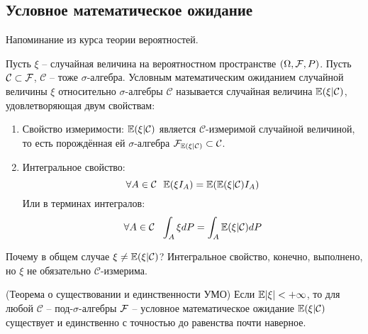 \subsection{Условное математическое ожидание}

\begin{note}
    Напоминание из курса теории вероятностей.
\end{note}

\begin{definition}
    Пусть $\xi$ -- случайная величина на вероятностном пространстве $(\Omega, \mathcal{F}, P)$. Пусть $\mathcal{C} \subset \mathcal{F}$, $\mathcal{C}$ -- тоже $\sigma$-алгебра. Условным математическим ожиданием случайной величины $\xi$ относительно $\sigma$-алгебры $\mathcal{C}$ называется случайная величина $\mathbb{E}(\xi | \mathcal{C})$, удовлетворяющая двум свойствам:
    \begin{enumerate}
        \item Свойство измеримости: $\mathbb{E}(\xi | \mathcal{C})$ является $\mathcal{C}$-измеримой случайной величиной, то есть порождённая ей $\sigma$-алгебра $\mathcal{F}_{\mathbb{E}(\xi | \mathcal{C})} \subset \mathcal{C}$.

        \item Интегральное свойство:
        \[
            \forall A \in \mathcal{C} \ \ \mathbb{E}(\xi I_A) = \mathbb{E}(\mathbb{E}(\xi | \mathcal{C}) I_A)
        \]
        Или в терминах интегралов:
        \[
            \forall A \in \mathcal{C} \ \ \int_A \xi dP = \int_A \mathbb{E}(\xi | \mathcal{C}) dP
        \]
    \end{enumerate}
\end{definition}

\begin{note}
    Почему в общем случае $\xi \neq \mathbb{E}(\xi | \mathcal{C})$? Интегральное свойство, конечно, выполнено, но $\xi$ не обязательно $\mathcal{C}$-измерима.
\end{note}

\begin{theorem} (Теорема о существовании и единственности УМО)
    Если $\mathbb{E}|\xi| < +\infty$, то для любой $\mathcal{C}$ -- под-$\sigma$-алгебры $\mathcal{F}$ -- условное математическое ожидание $\mathbb{E}(\xi | \mathcal{C})$ существует и единственно с точностью до равенства почти наверное.
\end{theorem}

